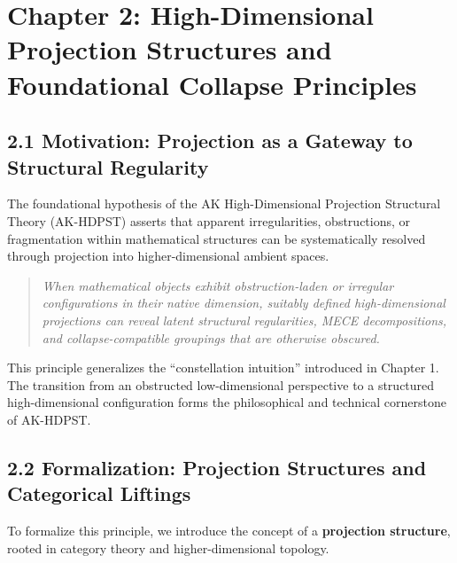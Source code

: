\documentclass[11pt]{article}
\begin{document}
\section{Chapter 2: High-Dimensional Projection Structures and Foundational Collapse Principles}

\subsection*{2.1 Motivation: Projection as a Gateway to Structural Regularity}

The foundational hypothesis of the AK High-Dimensional Projection Structural Theory (AK-HDPST) asserts that apparent irregularities, obstructions, or fragmentation within mathematical structures can be systematically resolved through projection into higher-dimensional ambient spaces.

\begin{quote}
\textit{
When mathematical objects exhibit obstruction-laden or irregular configurations in their native dimension,  
suitably defined high-dimensional projections can reveal latent structural regularities, MECE decompositions,  
and collapse-compatible groupings that are otherwise obscured.
}
\end{quote}

This principle generalizes the ``constellation intuition'' introduced in Chapter 1. The transition from an obstructed low-dimensional perspective to a structured high-dimensional configuration forms the philosophical and technical cornerstone of AK-HDPST.

\subsection*{2.2 Formalization: Projection Structures and Categorical Liftings}

To formalize this principle, we introduce the concept of a \textbf{projection structure}, rooted in category theory and higher-dimensional topology.
\end{document}

